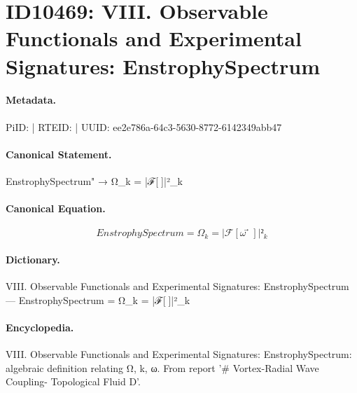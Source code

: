 \section*{ID10469: VIII. Observable Functionals and Experimental Signatures: EnstrophySpectrum}
\paragraph{Metadata.}
PiID:  | RTEID:  | UUID: ee2e786a-64c3-5630-8772-6142349abb47

\paragraph{Canonical Statement.}
EnstrophySpectrum" → Ω\_k = |ℱ[ω⃗]|²\_k

\paragraph{Canonical Equation.}
\[
EnstrophySpectrum = Ω_k = |ℱ[ω⃗]|²_k
\]

\paragraph{Dictionary.}
VIII. Observable Functionals and Experimental Signatures: EnstrophySpectrum — EnstrophySpectrum = Ω\_k = |ℱ[ω⃗]|²\_k

\paragraph{Encyclopedia.}
VIII. Observable Functionals and Experimental Signatures: EnstrophySpectrum: algebraic definition relating Ω, k, ω. From report '\# Vortex-Radial Wave Coupling- Topological Fluid D'.
